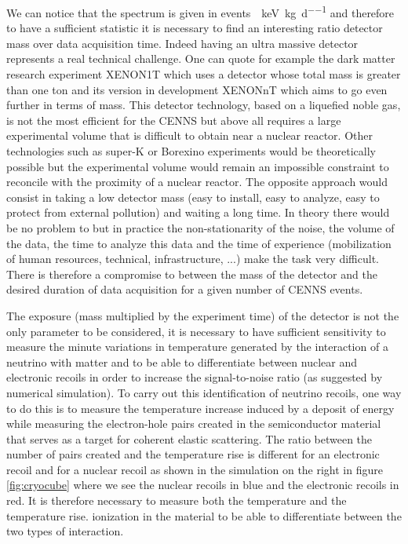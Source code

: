 We can notice that the spectrum is given in \si{events \per \kilo\eV \per \kg \per \day} and therefore to have a sufficient statistic it is necessary to find an interesting ratio detector mass over data acquisition time. Indeed having an ultra massive detector represents a real technical challenge. One can quote for example the dark matter research experiment XENON1T which uses a detector whose total mass is greater than one ton and its version in development XENONnT which aims to go even further in terms of mass.  This detector technology, based on a liquefied noble gas, is not the most efficient for the CENNS but above all requires a large experimental volume that is difficult to obtain near a nuclear reactor. Other technologies such as super-K or Borexino experiments would be theoretically possible but the experimental volume would remain an impossible constraint to reconcile with the proximity of a nuclear reactor. The opposite approach would consist in taking a low detector mass (easy to install, easy to analyze, easy to protect from external pollution) and waiting a long time. In theory there would be no problem to but in practice the non-stationarity of the noise, the volume of the data, the time to analyze this data and the time of experience (mobilization of human resources, technical, infrastructure, ...) make the task very difficult. There is therefore a compromise to between the mass of the detector and the desired duration of data acquisition for a given number of CENNS events.

The exposure (mass multiplied by the experiment time) of the detector is not the only parameter to be considered, it is necessary to have sufficient sensitivity to measure the minute variations in temperature generated by the interaction of a neutrino with matter and to be able to differentiate between nuclear and electronic recoils in order to increase the signal-to-noise ratio (as suggested by numerical simulation). To carry out this identification of neutrino recoils, one way to do this is to measure the temperature increase induced by a deposit of energy while measuring the electron-hole pairs created in the semiconductor material that serves as a target for coherent elastic scattering. The ratio between the number of pairs created and the temperature rise is different for an electronic recoil and for a nuclear recoil as shown in the simulation on the right in figure \ref{fig:cryocube} where we see the nuclear recoils in blue and the electronic recoils in red. It is therefore necessary to measure both the temperature and the temperature rise. ionization in the material to be able to differentiate between the two types of interaction.

